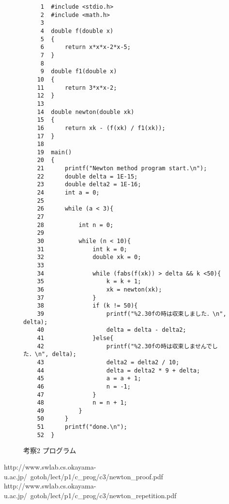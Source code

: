 \documentclass[12pt]{jarticle}
\begin{document}
\begin{figure}[t]
\begin{screen}
\footnotesize
\begin{verbatim}
     1	#include <stdio.h>
     2	#include <math.h> 
     3	
     4	double f(double x)
     5	{
     6	    return x*x*x-2*x-5;
     7	}
     8	
     9	double f1(double x)
    10	{
    11	    return 3*x*x-2;
    12	}
    13	
    14	double newton(double xk)
    15	{
    16	    return xk - (f(xk) / f1(xk));
    17	}
    18	
    19	main()
    20	{
    21	    printf("Newton method program start.\n");
    22	    double delta = 1E-15;
    23	    double delta2 = 1E-16;
    24	    int a = 0;
    25	
    26	    while (a < 3){
    27	
    28	        int n = 0;
    29	
    30	        while (n < 10){
    31	            int k = 0;
    32	            double xk = 0;
    33	
    34	            while (fabs(f(xk)) > delta && k <50){
    35	                k = k + 1;
    36	                xk = newton(xk);
    37	            }
    38	            if (k != 50){
    39	                printf("%2.30fの時は収束しました．\n", delta);
    40	                delta = delta - delta2;
    41	            }else{
    42	                printf("%2.30fの時は収束しませんでした．\n", delta);
    43	                delta2 = delta2 / 10;
    44	                delta = delta2 * 9 + delta;
    45	                a = a + 1;
    46	                n = -1;
    47	            }
    48	            n = n + 1;
    49	        }
    50	    }
    51	    printf("done.\n");
    52	}
\end{verbatim}
\end{screen}
\caption{考察2 プログラム}
\label{fig:4a}
\end{figure}



  http://www.swlab.cs.okayama-u.ac.jp/~gotoh/lect/p1/c\_prog/c3/newton\_proof.pdf
  http://www.swlab.cs.okayama-u.ac.jp/~gotoh/lect/p1/c\_prog/c3/newton\_repetition.pdf
\end{document}
